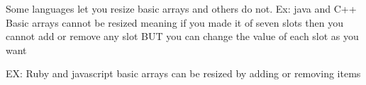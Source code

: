 Some languages let you resize basic arrays and others do not.
  Ex: 
  java and C++
    Basic arrays cannot be resized 
    meaning if you made it of seven slots then you cannot add or remove any slot 
    BUT you can change the value of each slot as you want

  EX:
  Ruby and javascript
    basic arrays can be resized by adding or removing items 

